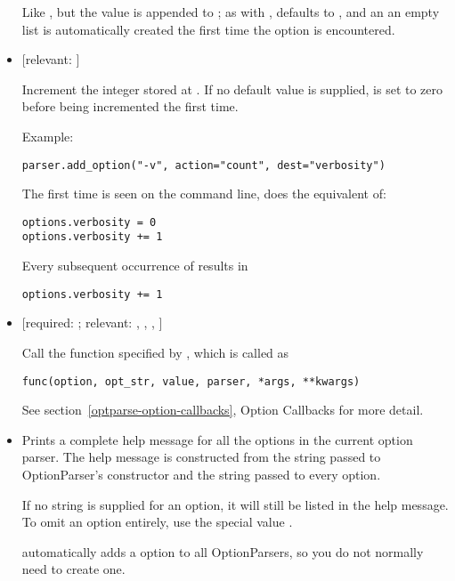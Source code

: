 \begin{itemize}
Like , but the value  is appended to ;
as with ,  defaults to , and an an empty list is
automatically created the first time the option is encountered.

\item {} 
 {[}relevant: ]

Increment the integer stored at .  If no default value is
supplied,  is set to zero before being incremented the first
time.

Example:
\begin{verbatim}
parser.add_option("-v", action="count", dest="verbosity")
\end{verbatim}

The first time  is seen on the command line,  does the
equivalent of:
\begin{verbatim}
options.verbosity = 0
options.verbosity += 1
\end{verbatim}

Every subsequent occurrence of  results in
\begin{verbatim}
options.verbosity += 1
\end{verbatim}

\item {} 
 {[}required: ;
relevant: , , , ]

Call the function specified by , which is called as
\begin{verbatim}
func(option, opt_str, value, parser, *args, **kwargs)
\end{verbatim}

See section~\ref{optparse-option-callbacks}, Option Callbacks for more detail.

\item {} 

Prints a complete help message for all the options in the
current option parser.  The help message is constructed from
the  string passed to OptionParser's constructor and
the  string passed to every option.

If no  string is supplied for an option, it will still be
listed in the help message.  To omit an option entirely, use
the special value .

 automatically adds a  option to all OptionParsers, so
you do not normally need to create one.


\end{itemize}

